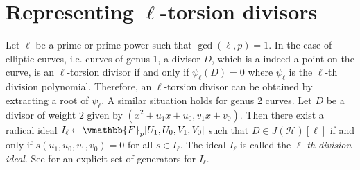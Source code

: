 \section{Representing $\ell$-torsion divisors}
\label{section:l-tor-rep}

Let $\ell$ be a prime or prime power such that $\gcd(\ell, p) = 1$. In the case of elliptic curves, 
i.e. curves of genus 1, a divisor $D$, which is a indeed a point on the curve, is an $\ell$-torsion 
divisor if and only if $\psi_\ell(D) = 0$ where $\psi_\ell$ is the $\ell$-th division polynomial. 
Therefore, an $\ell$-torsion divisor can be obtained by extracting a root of $\psi_\ell$. A similar 
situation holds for genus 2 curves. Let $D$ be a divisor of weight $2$ given by $(x^2 + u_1x + u_0, 
v_1x + v_0)$. Then there exist a radical ideal $I_\ell \subset \vmathbb{F}_p[U_1, U_0, V_1, V_0]$ 
such that $D \in J(\mathcal{H})[\ell]$ if and only if $s(u_1, u_0, v_1, v_0) = 0$ for all $s \in 
I_\ell$. The ideal $I_\ell$ is called the $\ell$-\emph{th division ideal}. See \cite{Kampkotter1991} 
for an explicit set of generators for $I_\ell$.

